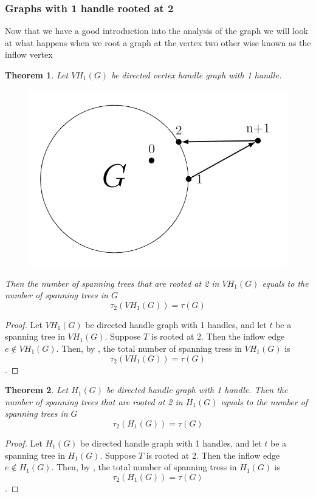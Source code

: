 \documentclass[twoside,11pt]{article}
\newtheorem{theorem}{Theorem}[section]
\numberwithin{equation}{section} \DeclareMathOperator{\Var}{Var}
\newcommand{\bpf}{\begin{proof}}
\newcommand{\epf}{\end{proof}}
\newcommand{\bthm}{\begin{theorem}}
\newcommand{\ethm}{\end{theorem}}
\begin{document}
\subsubsection{Graphs with 1 handle rooted at 2}
Now that we have a good introduction into the analysis of the graph we will look at what happens when we root a graph at the vertex two other wise known as the inflow vertex 

\bthm
Let $VH_1(G)$ be directed vertex handle graph with 1 handle.
\begin{figure}[H]
    \centering
    \includegraphics[scale=0.3]{tik_1handle.PNG}
\end{figure}
Then the number of spanning trees that are rooted at 2 in $VH_1(G)$ equals to the number of spanning trees in $G$   \[
 \tau_2 (VH_1(G)) = \tau(G)
\]
\ethm

\bpf
Let $VH_1(G)$ be directed handle graph with 1 handles, and let $t$ be a spanning tree in $VH_1(G)$. Suppose $T$ is rooted at 2. Then the inflow edge $e\notin VH_1(G)$. Then, by , the total number of spanning tress in $VH_1(G)$ is  $$ \tau_2 (VH_1(G)) = \tau(G)$$.
\epf


\bthm\label{DH rooted 2}
Let $H_1(G)$ be directed handle graph with 1 handle. Then the number of spanning trees that are rooted at 2 in $H_1(G)$ equals to the number of spanning trees in $G$   \[
 \tau_2 (H_1(G)) = \tau(G)
\]
\ethm

\bpf
Let $H_1(G)$ be directed handle graph with 1 handles, and let $t$ be a spanning tree in $H_1(G)$. Suppose $T$ is rooted at 2. Then the inflow edge $e\notin H_1(G)$. Then, by , the total number of spanning tress in $H_1(G)$ is  $$ \tau_2 (H_1(G)) = \tau(G)$$.
\epf
\end{document}
